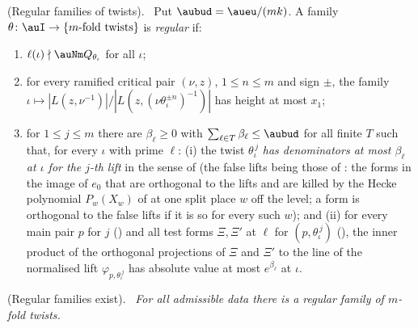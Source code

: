 \documentclass[10pt]{amsart}
\theoremstyle{definition}
\theoremstyle{remark}
\newenvironment{quotedthm}[2]{\par\medskip\noindent\begingroup
  \textbf{#1}#2.\ \itshape\ignorespaces}{\endgroup\par\medskip}
\newenvironment{quoteddef}[2]{\par\medskip\noindent\begingroup
  \textbf{#1}#2.\ \ignorespaces}{\endgroup\par\medskip}
\begin{document}
\begin{quoteddef}{\cite[Definition~14.39]{P46}}{ (Regular families of twists)}
Put $\aubud=\aueu/(mk)$. A family $\theta\colon\auI\to\{m\text{-fold twists}\}$ is \emph{regular}
if:
\begin{enumerate}
\item[(R1)] $\ell(\iota)\nmid\auNm Q_{\theta_\iota}$ for all $\iota$;
\item[(R2)] for every ramified critical pair $(\nu,z)$, $1\le n\le m$ and sign $\pm$, the family
$\iota\mapsto|L(z,\nu^{-1})|/|L(z,(\nu\theta_\iota^{\pm n})^{-1})|$ has height at most $x_1$;
\item[(R3)] for $1\le j\le m$ there are $\beta_\ell\ge0$ with $\sum_{\ell\in T}\beta_\ell\le
\aubud$ for all finite $T$ such that, for every $\iota$ with prime $\ell$: (i) the twist
$\theta_\iota^{\,j}$ \emph{has denominators at most $\beta_\ell$ at $\iota$ for the $j$-th lift}
in the sense of {\cite[Definition~2.8]{P54}} (the false lifts being those of
{\cite[Definition~2.6]{P54}}: the forms in the image of $e_0$ that are orthogonal to the lifts and
are killed by the Hecke polynomial $P_w(X_w)$ of {\cite[Lemma~2.2(L3)]{P54}} at one split place $w$
off the level; a form is orthogonal to the false lifts if it is so for every such $w$); and (ii)
for every main pair $p$ for $j$ ({\cite[Definition~2.19]{P54}}) and all test forms $\Xi,\Xi'$ at
$\ell$ for $(p,\theta_\iota^{\,j})$ ({\cite[Definition~2.22]{P54}}), the inner product of the orthogonal
projections of $\Xi$ and $\Xi'$ to the line of the normalised lift
$\varphi_{p,\theta_\iota^{\,j}}$ has absolute value at most $e^{\beta_\ell}$ at $\iota$.
\end{enumerate}
\end{quoteddef}

\begin{quotedthm}{\cite[Proposition~14.40]{P46}}{ (Regular families exist)}
For all admissible data there is a regular family of $m$-fold twists.
\end{quotedthm}
\end{document}
